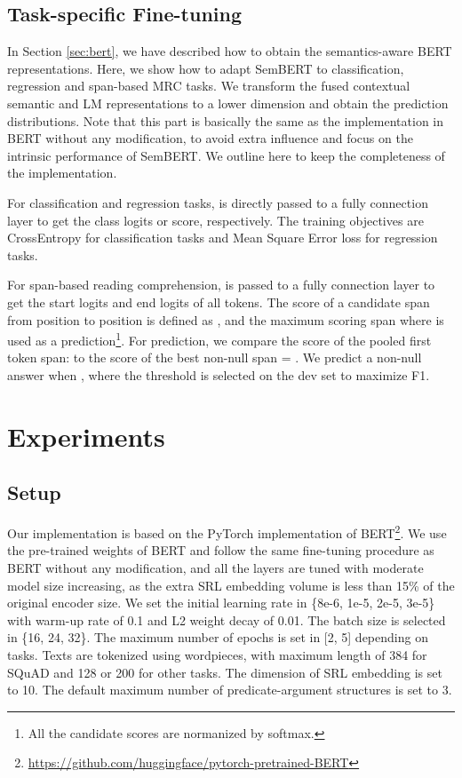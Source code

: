\documentclass[letterpaper]{article} \usepackage{aaai20}  \usepackage{times}  \usepackage{helvet} \usepackage{courier}  \usepackage[hyphens]{url}  \usepackage{graphicx} \urlstyle{rm} \def\UrlFont{\rm}  \usepackage{graphicx}  \frenchspacing  \usepackage{amssymb}
\begin{document}
\subsection{Task-specific Fine-tuning} \label{task-specific}
In Section \ref{sec:bert}, we have described how to obtain the semantics-aware BERT representations. Here, we show how to adapt SemBERT to classification, regression and span-based MRC tasks. We transform the fused contextual semantic and LM representations  to a lower dimension and obtain the prediction distributions. Note that this part is basically the same as the implementation in BERT without any modification, to avoid extra influence and focus on the intrinsic performance of SemBERT. We outline here to keep the completeness of the implementation.

For classification and regression tasks,  is directly passed to a fully connection layer to get the class logits or score, respectively. The training objectives are CrossEntropy for classification tasks and Mean Square Error loss for regression tasks. 

For span-based reading comprehension,  is passed to a fully connection layer to get the start logits  and end logits  of all tokens. The score of a candidate span from position  to position  is defined as  , and the maximum scoring span where  is used as a prediction\footnote{All the candidate scores are normanized by softmax.}. For prediction, we compare
the score of the pooled first token span:  to the score of the best non-null span  =  . We predict a non-null answer when  , where the threshold  is selected on the dev set to maximize F1.

\section{Experiments}
\subsection{Setup}
Our implementation is based on the PyTorch implementation of BERT\footnote{\url{https://github.com/huggingface/pytorch-pretrained-BERT}}. We use the pre-trained weights of BERT and follow the same fine-tuning procedure as BERT without any modification, and all the layers are tuned with moderate model size increasing, as the extra SRL embedding volume is less than 15\% of the original encoder size. We set the initial learning rate in \{8e-6, 1e-5, 2e-5, 3e-5\} with warm-up rate of 0.1 and L2 weight decay of 0.01. The batch size is selected in \{16, 24, 32\}. The maximum number of epochs is set in [2, 5] depending on tasks. Texts are tokenized using wordpieces, with maximum length of 384 for SQuAD and 128 or 200 for other tasks. The dimension of SRL embedding is set to 10. The default maximum number of predicate-argument structures  is set to 3.
\end{document}
